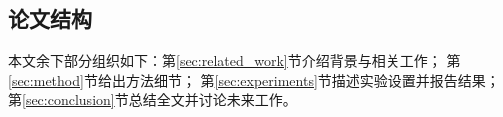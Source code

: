 \subsection{论文结构}
本文余下部分组织如下：第\ref{sec:related_work}节介绍背景与相关工作；
第\ref{sec:method}节给出方法细节；
第\ref{sec:experiments}节描述实验设置并报告结果；
第\ref{sec:conclusion}节总结全文并讨论未来工作。
